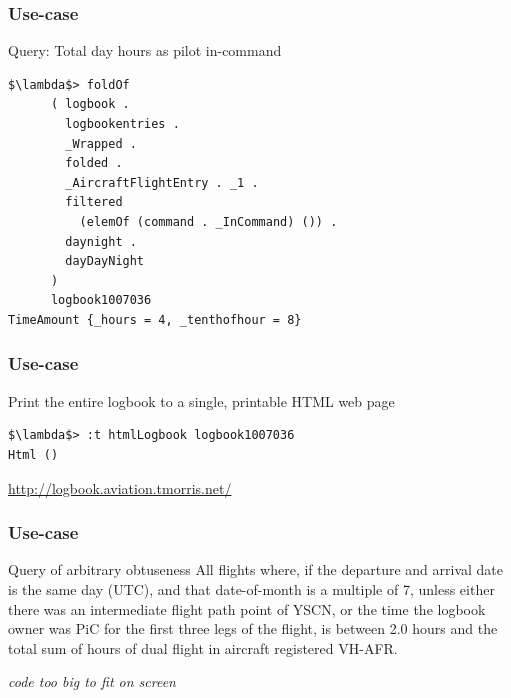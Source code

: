 \begin{frame}[fragile]
\frametitle{Use-case}
\begin{block}{Query: Total day hours as pilot in-command}
\begin{lstlisting}[style=haskell,basicstyle=\scriptsize\ttfamily,mathescape]
$\lambda$> foldOf
      ( logbook .
        logbookentries .
        _Wrapped .
        folded .
        _AircraftFlightEntry . _1 .
        filtered
          (elemOf (command . _InCommand) ()) .
        daynight .
        dayDayNight
      )
      logbook1007036
TimeAmount {_hours = 4, _tenthofhour = 8}
\end{lstlisting}
\end{block}
\end{frame}

\begin{frame}[fragile]
\frametitle{Use-case}
\begin{block}{Print the entire logbook to a single, printable HTML web page}
\begin{lstlisting}[style=haskell,mathescape]
$\lambda$> :t htmlLogbook logbook1007036
Html ()
\end{lstlisting}
\end{block}
\href{http://logbook.aviation.tmorris.net/}{http://logbook.aviation.tmorris.net/}
\end{frame}

\begin{frame}[fragile]
\frametitle{Use-case}
\begin{block}{Query of arbitrary obtuseness}
All flights where, if the departure and arrival date is the same day (UTC), and that date-of-month is a multiple of 7, unless either there was an intermediate flight path point of YSCN, or the time the logbook owner was PiC for the first three legs of the flight, is between 2.0 hours and the total sum of hours of dual flight in aircraft registered VH-AFR.

\emph{code too big to fit on screen}
\end{block}
\end{frame}

